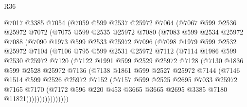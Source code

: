 \begin{lexlean}{R36}
\begin{coremodule}
        @7017
        @3385
        @7054
        (@7059
          @599
          @2537
          @25972
          @7064
          (@7067
            @599
            @2536
            @25972
            @7072
            (@7075
              @599
              @2535
              @25972
              @7080
              (@7083
                @599
                @2534
                @25972
                @7088
                (@7090
                  @1973
                  @599
                  @2533
                  @25972
                  @7096
                  (@7098
                    @1979
                    @599
                    @2532
                    @25972
                    @7104
                    (@7106
                      @795
                      @599
                      @2531
                      @25972
                      @7112
                      (@7114
                        @1986
                        @599
                        @2530
                        @25972
                        @7120
                        (@7122
                          @1991
                          @599
                          @2529
                          @25972
                          @7128
                          (@7130
                            @1836
                            @599
                            @2528
                            @25972
                            @7136
                            (@7138
                              @1861
                              @599
                              @2527
                              @25972
                              @7144
                              (@7146
                                @1514
                                @599
                                @2526
                                @25972
                                @7152
                                (@7157
                                  @599
                                  @2525
                                  @2695
                                  @7033
                                  @25972
                                  @7165
                                  @7170
                                  (@7172
                                    @596
                                    @220
                                    @453
                                    @3665
                                    @3665
                                    @2695
                                    @3385
                                    @7180
                                    @11821))))))))))))))))

\end{coremodule}
\end{lexlean}

